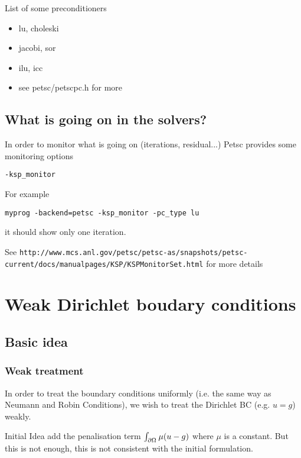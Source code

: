 List of some preconditioners
\begin{itemize}
\item lu, choleski
\item jacobi, sor
\item ilu, icc
\item see petsc/petscpc.h for more
\end{itemize}

\subsection{What is going on in the solvers?}
\label{sec:what-going-solvers}

In order to monitor what is going on (iterations, residual...) Petsc
provides some monitoring options
\begin{verbatim}
-ksp_monitor
\end{verbatim}
For example
\begin{verbatim}
myprog -backend=petsc -ksp_monitor -pc_type lu
\end{verbatim}
it should show only one iteration.

See {\tiny\texttt{http://www.mcs.anl.gov/petsc/petsc-as/snapshots/petsc-current/docs/manualpages/KSP/KSPMonitorSet.html}} for more details



\section{Weak Dirichlet boudary conditions}
\label{sec:weak-dirichl-boud}

\subsection{Basic idea}

\subsubsection{Weak treatment}
  In order to treat the boundary conditions uniformly (i.e. the same
  way as Neumann and Robin Conditions), we wish to treat the Dirichlet
  BC (e.g. $u=g$) weakly.

  \begin{remark}{Initial Idea}
    add the penalisation term $\int_{\partial {\ensuremath{\Omega^{}}}} \mu( u - g
    )$ where $\mu$ is a constant. But this is not enough, this is not consistent with the
    initial formulation.
  \end{remark}

